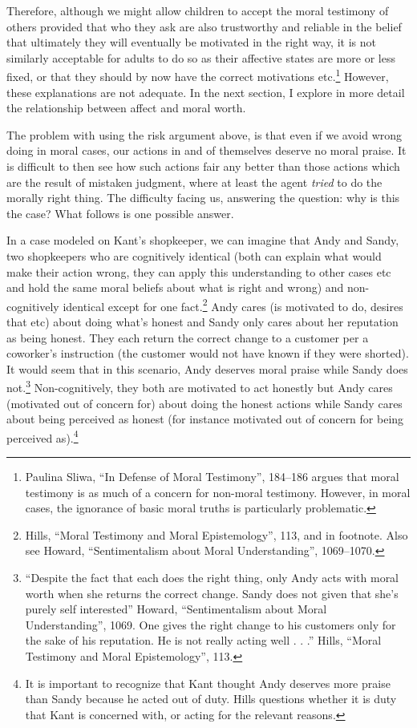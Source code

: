 \documentclass[phdthesis,12pt,final]{wuthesis}
\theoremstyle{definition}
\theoremstyle{definition}
\theoremstyle{definition}
\theoremstyle{definition}
\theoremstyle{remark}
\begin{document}
Therefore, although we might allow children to accept the moral testimony of others provided that who they ask are also trustworthy and reliable in the belief that ultimately they will eventually be motivated in the right way, it is not similarly acceptable for adults to do so as their affective states are more or less fixed, or that they should by now have the correct motivations etc.\footnote{Paulina Sliwa, {``In Defense of Moral Testimony''}, 184--186 argues that moral testimony is as much of a concern for non-moral testimony. However, in moral cases, the ignorance of basic moral truths is particularly problematic.} However, these explanations are not adequate. In the next section, I explore in more detail the relationship between affect and moral worth.

The problem with using the risk argument above, is that even if we avoid wrong doing in moral cases, our actions in and of themselves deserve no moral praise. It is difficult to then see how such actions fair any better than those actions which are the result of mistaken judgment, where at least the agent \emph{tried} to do the morally right thing. The difficulty facing us, answering the question: why is this the case? What follows is one possible answer.

In a case modeled on Kant's shopkeeper, we can imagine that Andy and Sandy, two shopkeepers who are cognitively identical (both can explain what would make their action wrong, they can apply this understanding to other cases etc and hold the same moral beliefs about what is right and wrong) and non-cognitively identical except for one fact.\footnote{Hills, {``Moral Testimony and Moral Epistemology''}, 113, and in footnote. Also see Howard, {``Sentimentalism about {Moral Understanding}''}, 1069--1070.} Andy cares (is motivated to do, desires that etc) about doing what's honest and Sandy only cares about her reputation as being honest. They each return the correct change to a customer per a coworker's instruction (the customer would not have known if they were shorted). It would seem that in this scenario, Andy deserves moral praise while Sandy does not.\footnote{``Despite the fact that each does the right thing, only Andy acts with moral worth when she returns the correct change. Sandy does not given that she's purely self interested'' Howard, {``Sentimentalism about {Moral Understanding}''}, 1069. One gives the right change to his customers only for the sake of his reputation. He is not really acting well . . .'' Hills, {``Moral Testimony and Moral Epistemology''}, 113.} Non-cognitively, they both are motivated to act honestly but Andy cares (motivated out of concern for) about doing the honest actions while Sandy cares about being perceived as honest (for instance motivated out of concern for being perceived as).\footnote{It is important to recognize that Kant thought Andy deserves more praise than Sandy because he acted out of duty. Hills questions whether it is duty that Kant is concerned with, or acting for the relevant reasons.}
\end{document}
